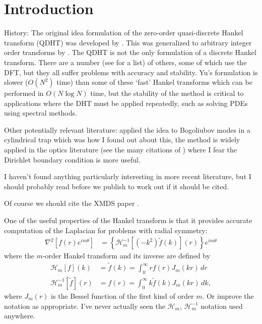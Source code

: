 \documentclass[aip,amsmath,amssymb,reprint,twocolumn]{revtex4-1}
\begin{document}
\section{Introduction}
\label{sec:Introduction}

History: The original idea formulation of the zero-order quasi-discrete Hankel transform (QDHT) was developed by \citet{Yu:1998}.  This was generalized to arbitrary integer order transforms by \citet{Guizar-Sicairos:2004}.  The QDHT is not the only formulation of a discrete Hankel transform.  There are a number (see \citep{Yu:1998} for a list) of others, some of which use the DFT, but they all suffer problems with accuracy and stability.  Yu's formulation is slower ($O(N^2)$ time) than some of these `fast' Hankel transforms which can be performed in $O(N \log N)$ time, but the stability of the method is critical to applications where the DHT must be applied repeatedly, such as solving PDEs using spectral methods.

Other potentially relevant literature: \citet{Ronen:2006} applied the idea to Bogoliubov modes in a cylindrical trap which was how I found out about this, the method is widely applied in the optics literature (see the many citations of \citet{Guizar-Sicairos:2004}) where I fear the Dirichlet boundary condition is more useful.

I haven't found anything particularly interesting in more recent literature, but I should probably read \citet{Cerjan:2007} before we publish to work out if it should be cited.

Of course we should cite the XMDS paper \citep{Dennis:2013}.

One of the useful properties of the Hankel transform is that it provides accurate computation of the Laplacian for problems with radial symmetry:
\begin{align}
  \nabla^2 \left[f(r) e^{i m \theta}\right] &= \left\{\mathcal{H}^{-1}_m\left[(-k^2)\tilde{f}(k)\right](r)\right\}e^{i m \theta}
\end{align}
where the $m$-order Hankel transform and its inverse are defined by
\begin{align}
  \mathcal{H}_m[f](k) &= \tilde{f}(k) = \int_0^{\infty} r f(r) J_m(k r) \, dr \\
  \mathcal{H}^{-1}_m[\tilde{f}](r) &= f(r) = \int_0^{\infty} k \tilde{f}(k) J_m(k r)\, dk,
\end{align}
where $J_m(r)$ is the Bessel function of the first kind of order $m$. Or improve the notation as appropriate.  I've never actually seen the $\mathcal{H}_m$, $\mathcal{H}^{-1}_m$ notation used anywhere.
\end{document}
